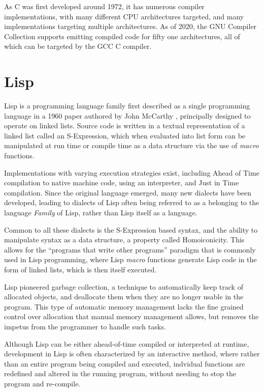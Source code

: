 \documentclass[10pt]{report}
\begin{document}
As C was first developed around 1972\cite{10.1145/154766.155580}, it has numerous compiler implementations, with many different CPU architectures targeted, and many implementations targeting multiple architectures. As of 2020, the GNU Compiler Collection supports emitting compiled code for fifty one architectures\cite{gcc-backends}, all of which can be targeted by the GCC C compiler.

\section{Lisp}
Lisp is a programming language family first described as a single programming language in a 1960 paper authored by John McCarthy \cite{MccarthyJohn1960Rfos}, principally designed to operate on linked lists. Source code is written in a textual representation of a linked list called an S-Expression, which when evaluated into list form can be manipulated at run time or compile time as a data structure via the use of \textit{macro} functions.

Implementations with varying execution strategies exist, including Ahead of Time compilation to native machine code\cite{sbcl}, using an interpreter\cite{ecl}, and Just in Time  compilation\cite{pixie}. Since the original language emerged, many new dialects have been developed, leading to dialects of Lisp often being referred to as a belonging to the language \textit{Family} of Lisp, rather than Lisp itself as a language.

Common to all these dialects is the S-Expression based syntax, and the ability to manipulate syntax as a data structure, a property called Homoiconicity\cite{kay-homoiconicity}. This allows for the ``programs that write other programs'' paradigm that is commonly used in Lisp programming, where Lisp \textit{macro} functions generate Lisp code in the form of linked lists, which is then itself executed.

Lisp pioneered garbage collection\cite{And83areal-time}, a technique to automatically keep track of allocated objects, and deallocate them when they are no longer usable in the program. This type of automatic memory management lacks the fine grained control over allocation that manual memory management allows, but removes the impetus from the programmer to handle such tasks.

Although Lisp can be either ahead-of-time compiled or interpreted at runtime, development in Lisp is often characterized by an interactive method, where rather than an entire program being compiled and executed, indvidual functions are redefined and altered in the running program, without needing to stop the program and re-compile.
\end{document}
